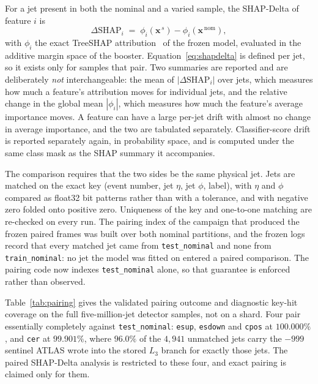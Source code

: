 \documentclass[pdflatex,sn-mathphys,Numbered,iicol]{sn-jnl}
\begin{document}
For a jet present in both the nominal and a varied sample, the SHAP-Delta of feature
$i$ is
\begin{equation}
\Delta\mathrm{SHAP}_i \;=\; \phi_i(\mathbf{x}^{\,s}) - \phi_i(\mathbf{x}^{\,\mathrm{nom}}),
\label{eq:shapdelta}
\end{equation}
with $\phi_i$ the exact TreeSHAP attribution~\cite{Lundberg2020trees} of the frozen
model, evaluated in the additive margin space of the booster. Equation~\ref{eq:shapdelta}
is defined per jet, so it exists only for samples that pair. Two summaries are
reported and are deliberately \emph{not} interchangeable: the mean of
$|\Delta\mathrm{SHAP}_i|$ over jets, which measures how much a feature's attribution
moves for individual jets, and the relative change in the global mean $|\phi_i|$, which
measures how much the feature's average importance moves. A feature can have a large
per-jet drift with almost no change in average importance, and the two are tabulated
separately. Classifier-score drift is reported separately again, in probability space,
and is computed under the same class mask as the SHAP summary it accompanies.

The comparison requires that the two sides be the same physical jet. Jets are matched
on the exact key (event number, jet $\eta$, jet $\phi$, label), with $\eta$ and $\phi$
compared as float32 bit patterns rather than with a tolerance, and with negative zero
folded onto positive zero. Uniqueness of the key and one-to-one matching are re-checked
on every run. The pairing index of the campaign that produced the frozen paired frames
was built over both nominal partitions, and the frozen logs record that every matched
jet came from \texttt{test\_nominal} and none from \texttt{train\_nominal}: no jet the
model was fitted on entered a paired comparison. The pairing code now indexes
\texttt{test\_nominal} alone, so that guarantee is enforced rather than observed.

Table~\ref{tab:pairing} gives the validated pairing outcome and diagnostic key-hit
coverage on the full five-million-jet detector samples, not on a shard. Four pair
essentially completely against
\texttt{test\_nominal}: \texttt{esup}, \texttt{esdown} and \texttt{cpos} at $100.000\%$,
and \texttt{cer} at $99.901\%$, where $96.0\%$ of the $4{,}941$ unmatched jets carry
the $-999$ sentinel ATLAS wrote into the stored $L_3$ branch for exactly those jets.
The paired SHAP-Delta analysis is restricted to these four, and exact pairing is
claimed only for them.
\end{document}
